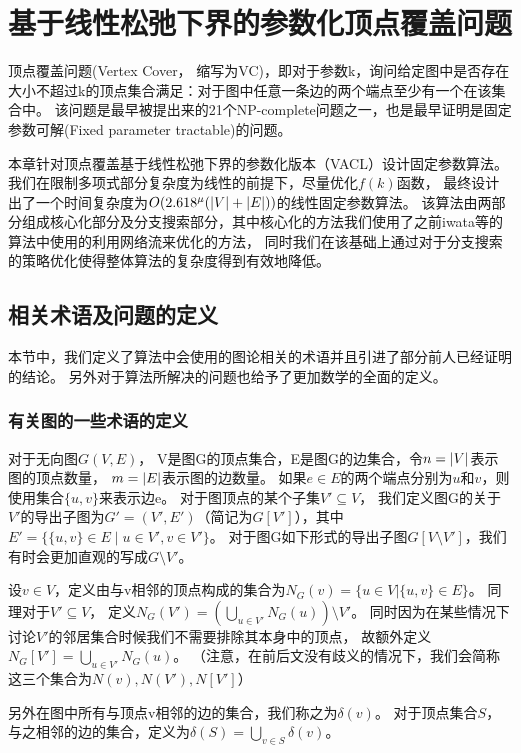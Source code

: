 \chapter{基于线性松弛下界的参数化顶点覆盖问题}
顶点覆盖问题(Vertex Cover， 缩写为VC)，即对于参数k，询问给定图中是否存在大小不超过k的顶点集合满足：对于图中任意一条边的两个端点至少有一个在该集合中。
该问题是最早被提出来的21个NP-complete问题之一\cite{karp1972reducibility}，也是最早证明是固定参数可解(Fixed parameter tractable)的问题\cite{downey2012parameterized}。

本章针对顶点覆盖基于线性松弛下界的参数化版本（VACL）设计固定参数算法。
我们在限制多项式部分复杂度为线性的前提下，尽量优化$f(k)$函数，
最终设计出了一个时间复杂度为$O(2.618^{\mu}(\left\vert V \right\vert + \left\vert E \right\vert))$的线性固定参数算法。
该算法由两部分组成核心化部分及分支搜索部分，其中核心化的方法我们使用了之前iwata等的算法中使用的利用网络流来优化的方法，
同时我们在该基础上通过对于分支搜索的策略优化使得整体算法的复杂度得到有效地降低。

\section{相关术语及问题的定义}
本节中，我们定义了算法中会使用的图论相关的术语并且引进了部分前人已经证明的结论。
另外对于算法所解决的问题也给予了更加数学的全面的定义。

\subsection{有关图的一些术语的定义}
对于无向图$G(V,E)$， V是图G的顶点集合，E是图G的边集合，令$n = \left\vert V \right\vert$表示图的顶点数量， $m = \left\vert E \right\vert$表示图的边数量。
如果$e \in E$的两个端点分别为$u$和$v$，则使用集合$\{u, v \}$来表示边e。
对于图顶点的某个子集$V' \subseteq V$， 我们定义图G的关于$V'$的导出子图为$G' = (V', E')$（简记为$G[V']$），其中$E' = \{\{u, v\} \in E\;|\;u \in V', v \in V' \}$。
对于图G如下形式的导出子图$G[V \setminus V']$，我们有时会更加直观的写成$G \setminus V'$。

设$v \in V$，定义由与v相邻的顶点构成的集合为$N_{G}(v) = \{ u \in V | \{u, v\} \in E\}$。
同理对于$V' \subseteq V$， 定义$N_{G}(V') = (\bigcup_{u \in V'}N_{G}(u)) \setminus V' $。
同时因为在某些情况下讨论$V'$的邻居集合时候我们不需要排除其本身中的顶点，
故额外定义$N_{G}[V'] = \bigcup_{u \in V'}N_{G}(u)$。
（注意，在前后文没有歧义的情况下，我们会简称这三个集合为$N(v), N(V'),N[V']$）

另外在图中所有与顶点v相邻的边的集合，我们称之为$\delta(v)$。
对于顶点集合$S$，与之相邻的边的集合，定义为$\delta(S) = \bigcup_{v \in S}\delta(v)$。

